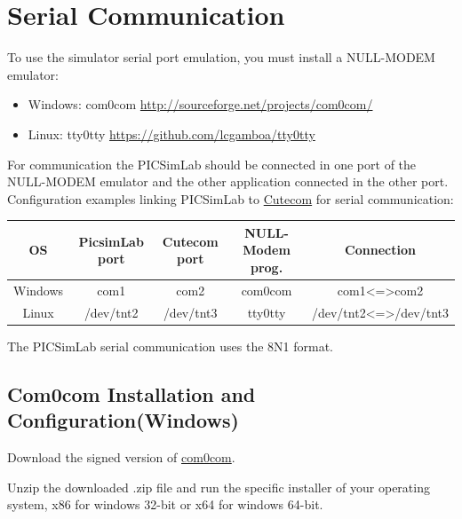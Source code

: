 \chapter{Serial Communication}  \hypertarget{def:seriali}{}


To use the simulator serial port emulation, you must install a NULL-MODEM emulator:

\begin{itemize}
 \item Windows: com0com \url{http://sourceforge.net/projects/com0com/}
 \item Linux: tty0tty  \url{https://github.com/lcgamboa/tty0tty}
 \end{itemize}

For communication the PICSimLab should be connected in one port of the NULL-MODEM emulator and the other application connected in the other port.
Configuration examples linking PICSimLab to \href{https://github.com/neundorf/CuteCom}{Cutecom} for serial communication:
 \vspace{0.5cm}
 
 \begin{tabular}{|c|c|c|c|c|}
 \hline OS&  PicsimLab port&  Cutecom port & NULL-Modem prog. &Connection\\
 \hline 
 \hline Windows&  com1 & com2 &com0com &com1<=>com2\\
 \hline Linux &  /dev/tnt2 & /dev/tnt3 &tty0tty &/dev/tnt2<=>/dev/tnt3\\
 \hline 
 \end{tabular}
 \vspace{0.5cm}
 
 The PICSimLab serial communication uses the 8N1 format.
 
 \section{Com0com Installation and Configuration(Windows)}
 
 Download the signed version of \href{https://sourceforge.net/projects/com0com/files/com0com/3.0.0.0/com0com-3.0.0.0-i386-and-x64-signed.zip/download}{com0com}.
 
Unzip the downloaded .zip file and run the specific installer of your operating system, x86 for windows 32-bit or x64 for windows 64-bit.
 
